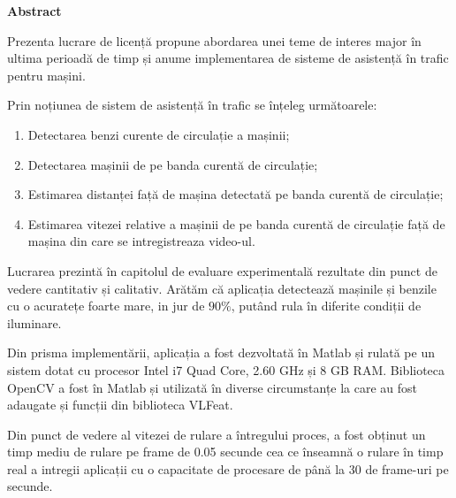 \thispagestyle{plain}

\begin{center}
	\Large \textbf{Abstract}	
\end{center}

Prezenta lucrare de licență propune abordarea unei teme de interes major în ultima perioadă de timp și anume implementarea de sisteme de asistență în trafic pentru mașini. 

Prin noțiunea de sistem de asistență în trafic se înțeleg următoarele:

\begin{enumerate}
	\item Detectarea benzi curente de circulație a mașinii;
	\item Detectarea mașinii de pe banda curentă de circulație;
	\item Estimarea distanței față de mașina detectată pe banda curentă de circulație;
	\item Estimarea vitezei relative a mașinii de pe banda curentă de circulație față de mașina din care se intregistreaza video-ul.
\end{enumerate}

Lucrarea prezintă în capitolul de evaluare experimentală rezultate din punct de vedere cantitativ și calitativ. Arătăm că aplicația detectează mașinile și benzile cu o acuratețe foarte mare, in jur de $90\%$, putând rula în diferite condiții de iluminare.

Din prisma implementării, aplicația a fost dezvoltată în Matlab și rulată pe un sistem dotat cu procesor Intel i7 Quad Core, 2.60 GHz și 8 GB RAM. Biblioteca OpenCV a fost în Matlab și utilizată în diverse circumstanțe la care au fost adaugate și funcții din biblioteca VLFeat.

Din punct de vedere al vitezei de rulare a întregului proces, a fost obținut un timp mediu de rulare pe frame de 0.05 secunde cea ce înseamnă o rulare în timp real a intregii aplicații cu o capacitate de procesare de până la 30 de frame-uri pe secunde.  
\vspace*{\fill}
